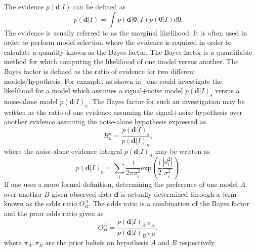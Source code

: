 %
%
The evidence $p(\bm{d}|I)$ can be defined as
%
\begin{equation}
    p(\bm{d}|I) = \int p(\bm{d}|\bm{\theta},I) p(\bm{\theta}|I) d\bm{\theta}.
    \label{eq:bayes_evidence}
\end{equation}
%
The evidence is usually referred to as the marginal 
likelihood. It is often used in order to 
perform model selection where the evidence is required in order to calculate a
quantity known as the 
Bayes factor. The Bayes factor is a quantifiable method for which computing 
the likelihood of one model versus another.
The Bayes factor is defined as the ratio of evidence for two 
different models/hypothesis. For example, as shown 
in~\cite{2019PASA...36...10T} 
one could investigate the likelihood for 
a model which assumes a signal+noise model $p(\bm{d}|I)_{s}$ 
versus a noise-alone model $p(\bm{d}|I)_{n}$. 
The Bayes factor for such an investigation may be written as 
the ratio of one evidence assuming the signal+noise hypothesis over 
another evidence assuming the noise-alone hypothesis expressed as 
%
\begin{equation}
    B^{s}_{n} = \frac{p(\bm{d}|I)_{s}}{p(\bm{d}|I)_{n}},
\end{equation}
%
where the noise-alone evidence integral $p(\bm{d}|I)_{n}$ may 
be written as  
%
\begin{equation}
    p(\bm{d}|I)_n = \sum_i \frac{1}{2\pi\sigma_{i}^2} 
    \mathrm{exp}(\frac{1}{2}\frac{|d_{i}^2|}{\sigma_{i}^2}).
\end{equation}
%
If one uses a more formal definition, determining the preference 
of one model $A$ over 
another $B$ given observed data $\bm{d}$ is actually determined through 
a term known as the odds ratio $O^{A}_{B}$. The odds ratio is  
a combination of the Bayes factor and the prior odds 
ratio given as
%
\begin{equation}
    O^{A}_{B} = \frac{p(\bm{d}|I)_A}{p(\bm{d}|I)_B} \frac{\pi_A}{\pi_B},
\end{equation}
%
where $\pi_A,\pi_B$ are the prior beliefs on hypothesis $A$ and $B$ 
respectively.


